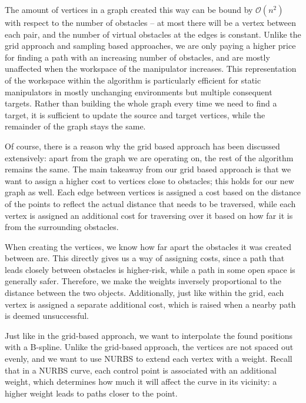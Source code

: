 The amount of vertices in a graph created this way can be bound by $\mathcal{O}(n^2)$ with respect to the number of obstacles -- at most there will be a vertex between each pair, and the number of virtual obstacles at the edges is constant. Unlike the grid approach and sampling based approaches, we are only paying a higher price for finding a path with an increasing number of obstacles, and are mostly unaffected when the workspace of the manipulator increases. This representation of the workspace within the algorithm is particularly efficient for static manipulators in mostly unchanging environments but multiple consequent targets. Rather than building the whole graph every time we need to find a target, it is sufficient to update the source and target vertices, while the remainder of the graph stays the same.

Of course, there is a reason why the grid based approach has been discussed extensively: apart from the graph we are operating on, the rest of the algorithm remains the same.
The main takeaway from our grid based approach is that we want to assign a higher cost to vertices close to obstacles; this holds for our new graph as well. Each edge between vertices is assigned a cost based on the distance of the points to reflect the actual distance that needs to be traversed, while each vertex is assigned an additional cost for traversing over it based on how far it is from the surrounding obstacles.

When creating the vertices, we know how far apart the obstacles it was created between are. This directly gives us a way of assigning costs, since a path that leads closely between obstacles is higher-risk, while a path in some open space is generally safer. Therefore, we make the weights inversely proportional to the distance between the two objects. Additionally, just like within the grid, each vertex is assigned a separate additional cost, which is raised when a nearby path is deemed unsuccessful.

Just like in the grid-based approach, we want to interpolate the found positions with a B-spline. Unlike the grid-based approach, the vertices are not spaced out evenly, and we want to use NURBS to extend each vertex with a weight. Recall that in a NURBS curve, each control point is associated with an additional weight, which determines how much it will affect the curve in its vicinity: a higher weight leads to paths closer to the point.


